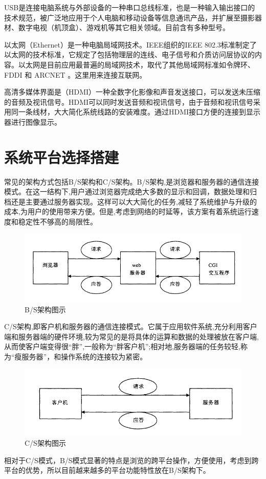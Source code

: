 USB是连接电脑系统与外部设备的一种串口总线标准，也是一种输入输出接口的技术规范，被广泛地应用于个人电脑和移动设备等信息通讯产品，并扩展至摄影器材、数字电视（机顶盒）、游戏机等其它相关领域。目前含有多种型号。

以太网（Ethernet）是一种电脑局域网技术。IEEE组织的IEEE 802.3标准制定了以太网的技术标准，它规定了包括物理层的连线、电子信号和介质访问层协议的内容。以太网是目前应用最普遍的局域网技术，取代了其他局域网标准如令牌环、 FDDI 和 ARCNET 。这里用来连接互联网。

高清多媒体界面是（HDMI）一种全数字化影像和声音发送接口，可以发送未压缩的音频及视讯信号。HDMI可以同时发送音频和视讯信号，由于音频和视讯信号采用同一条线材，大大简化系统线路的安装难度。通过HDMI接口方便的连接到显示器进行图像显示。



\section{系统平台选择搭建}
常见的架构方式包括B/S架构和C/S架构。B/S架构,是浏览器和服务器的通信连接模式。在这一结构下,用户通过浏览器完成绝大多数的显示和回调，数据处理和归档还是主要通过服务器实现。这样可以大大简化的任务,减轻了系统维护与升级的成本,为用户的使用带来方便。但是,考虑到网络的时延等，该方案有着系统运行速度和稳定性不够高的局限性。
\begin{figure}[h]
\centering
\includegraphics[width=0.7\linewidth]{Figure/bs01}
\caption{B/S架构图示}
\label{fig:bs01}
\end{figure}


C/S架构,即客户机和服务器的通信连接模式。它属于应用软件系统,充分利用客户端和服务器端的硬件环境,较为常见的是将具体的运算和数据的处理被放在客户端,从而使客户端变得很“胖”,一般称为“胖客户机”;相对地,服务器端的任务较轻,称为“瘦服务器”，和操作系统的连接较为紧密\cite{bscs}。
\begin{figure}[h]
\centering
\includegraphics[width=0.7\linewidth]{Figure/cs01}
\caption{C/S架构图示}
\label{fig:cs01}
\end{figure}

相对于C/S模式，B/S模式显著的特点是浏览的跨平台操作，方便使用，考虑到跨平台的优势，所以目前越来越多的平台功能特性放在B/S架构下\cite{bshome}。
